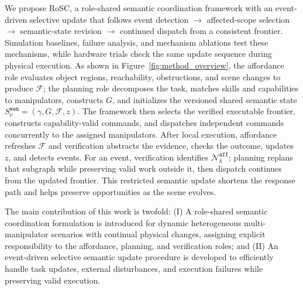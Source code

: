 We propose RoSC, a role-shared semantic coordination framework with
an event-driven selective update that follows event detection $\rightarrow$
affected-scope selection $\rightarrow$ semantic-state revision $\rightarrow$
continued dispatch from a consistent frontier. Simulation baselines, failure
analysis, and mechanism ablations test these mechanisms, while hardware trials
check the same update sequence during physical execution.
As shown in Figure~\ref{fig:method_overview},
the affordance role evaluates object regions, reachability, obstructions, and
scene changes to produce $\mathcal{F}$; the planning role decomposes the task,
matches skills and capabilities to manipulators, constructs $G$, and initializes
the versioned shared semantic state
$S_\nu^{\texttt{sem}}=(\gamma,G,\mathcal{F},z)$. The framework then selects the
verified executable frontier, constructs capability-valid commands, and
dispatches independent commands concurrently to the assigned manipulators.
After local execution, affordance refreshes $\mathcal{F}$ and verification
abstracts the evidence, checks the outcome, updates $z$, and detects events. For
an event, verification identifies $\mathcal{N}_k^{\texttt{aff}}$; planning
replans that subgraph while preserving valid work outside it, then dispatch
continues from the updated frontier. This restricted semantic update shortens
the response path and helps preserve opportunities as the scene evolves.

The main contribution of this work is twofold: (I) A role-shared semantic
coordination formulation is introduced for dynamic heterogeneous
multi-manipulator scenarios with continual physical changes, assigning explicit
responsibility to the affordance, planning, and verification roles; and (II) An
event-driven selective semantic update procedure is developed to efficiently
handle task updates, external disturbances, and execution failures while
preserving valid execution.

